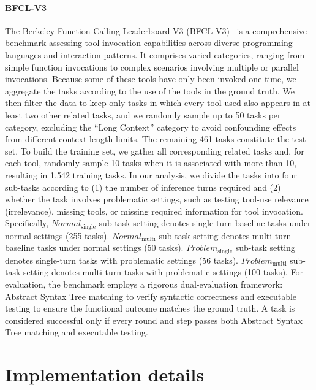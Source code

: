 \documentclass[11pt]{article}
\begin{document}
\paragraph{BFCL-V3} The Berkeley Function Calling Leaderboard V3 (BFCL-V3)~\citep{patilberkeley} is a comprehensive benchmark assessing tool invocation capabilities across diverse programming languages and interaction patterns. 
It comprises varied categories, ranging from simple function invocations to complex scenarios involving multiple or parallel invocations. Because some of these tools have only been invoked one time, we aggregate the tasks according to the use of the tools in the ground truth. We then filter the data to keep only tasks in which every tool used also appears in at least two other related tasks, and we randomly sample up to 50 tasks per category, excluding the ``Long Context'' category to avoid confounding effects from different context-length limits. The remaining 461 tasks constitute the test set. To build the training set, we gather all corresponding related tasks and, for each tool, randomly sample 10 tasks when it is associated with more than 10, resulting in 1,542 training tasks. In our analysis, we divide the tasks into four sub-tasks according to (1) the number of inference turns required and (2) whether the task involves problematic settings, such as testing tool-use relevance (irrelevance), missing tools, or missing required information for tool invocation. Specifically, $\textit{Normal}\mathrm{}_{\mathrm{single}}$ sub-task setting denotes single-turn baseline tasks under normal settings (255 tasks). $\textit{Normal}\mathrm{}_{\mathrm{multi}}$ sub-task setting denotes multi-turn baseline tasks under normal settings (50 tasks). $\textit{Problem}\mathrm{}_{\mathrm{single}}$ sub-task setting denotes single-turn tasks with problematic settings (56 tasks). $\textit{Problem}\mathrm{}_{\mathrm{multi}}$ sub-task setting denotes multi-turn tasks with problematic settings (100 tasks). 
For evaluation, the benchmark employs a rigorous dual-evaluation framework: Abstract Syntax Tree matching to verify syntactic correctness and executable testing to ensure the functional outcome matches the ground truth. A task is considered successful only if every round and step passes both Abstract Syntax Tree matching and executable testing.
\section{Implementation details}\label{app:tried}
\end{document}
